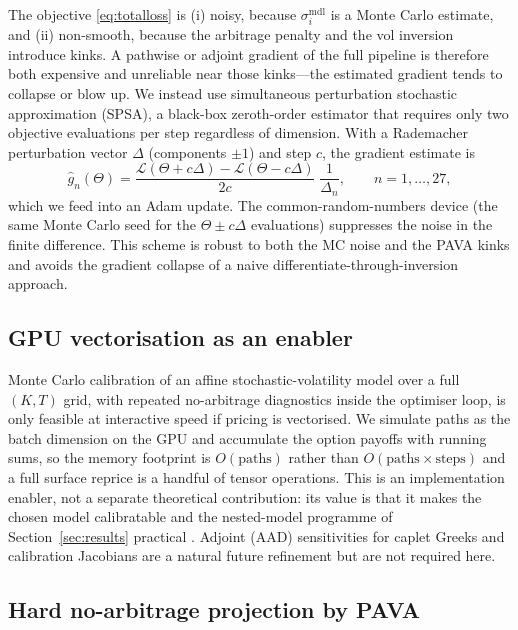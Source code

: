 \documentclass[11pt]{article}
\newcommand{\Nmdl}{\sigma^{\mathrm{mdl}}}
\theoremstyle{plain}
\theoremstyle{definition}
\begin{document}
The objective \eqref{eq:totalloss} is (i) noisy, because
$\Nmdl_i$ is a Monte Carlo estimate, and (ii) non-smooth, because
the arbitrage penalty and the vol inversion introduce kinks. A pathwise or
adjoint gradient of the full pipeline is therefore both expensive and unreliable
near those kinks---the estimated gradient tends to collapse or blow up. We
instead use simultaneous perturbation stochastic approximation (SPSA), a
black-box zeroth-order estimator that requires only two objective evaluations per
step regardless of dimension. With a Rademacher perturbation vector $\Delta$
(components $\pm 1$) and step $c$, the gradient estimate is
\begin{equation}
\widehat g_n(\Theta) = \frac{\mathcal L(\Theta + c\Delta)
   - \mathcal L(\Theta - c\Delta)}{2c}\;\frac{1}{\Delta_n},
   \qquad n = 1,\dots,27,
\label{eq:spsa}
\end{equation}
which we feed into an Adam update. The common-random-numbers device (the same
Monte Carlo seed for the $\Theta\pm c\Delta$ evaluations) suppresses the noise in
the finite difference. This scheme is robust to both the MC noise and the PAVA
kinks and avoids the gradient collapse of a naive differentiate-through-inversion
approach.

\subsection{GPU vectorisation as an enabler}

Monte Carlo calibration of an affine stochastic-volatility model over a full
$(K,T)$ grid, with repeated no-arbitrage diagnostics inside the optimiser loop,
is only feasible at interactive speed if pricing is vectorised. We simulate
paths as the batch dimension on the GPU and accumulate the option payoffs with
running sums, so the memory footprint is $O(\text{paths})$ rather than
$O(\text{paths}\times\text{steps})$ and a full surface reprice is a handful of
tensor operations. This is an implementation enabler, not a separate theoretical
contribution: its value is that it makes the chosen model calibratable and the
nested-model programme of Section~\ref{sec:results} practical
\citep{Savine2020,CapriottiGiles2024}. Adjoint (AAD) sensitivities for caplet
Greeks and calibration Jacobians are a natural future refinement but are not
required here.

\subsection{Hard no-arbitrage projection by PAVA}
\label{sec:noarb}
\end{document}
